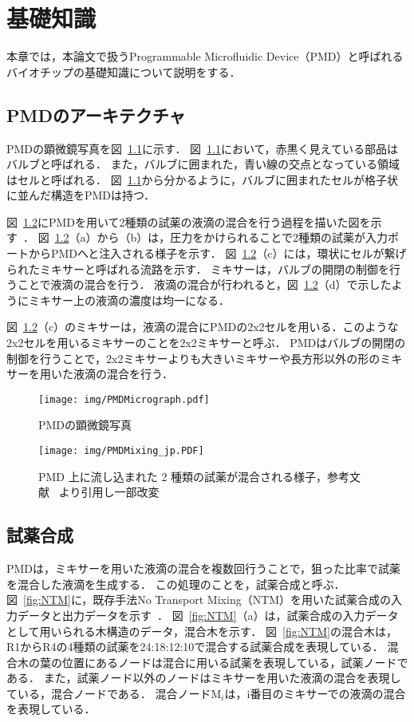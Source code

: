 \chapter{基礎知識}
本章では，本論文で扱うProgrammable Microfluidic Device（PMD）と呼ばれるバイオチップの基礎知識について説明をする．

\section{PMDのアーキテクチャ}
PMDの顕微鏡写真を図~\ref{fig:PMDMicrograph}に示す．
図~\ref{fig:PMDMicrograph}において，赤黒く見えている部品はバルブと呼ばれる．
また，バルブに囲まれた，青い線の交点となっている領域はセルと呼ばれる．
図~\ref{fig:PMDMicrograph}から分かるように，バルブに囲まれたセルが格子状に並んだ構造をPMDは持つ．

図~\ref{fig:MixingOnPMD}にPMDを用いて2種類の試薬の液滴の混合を行う過程を描いた図を示す~\cite{4}．
図~\ref{fig:MixingOnPMD}（a）から（b）は，圧力をかけられることで2種類の試薬が入力ポートからPMDへと注入される様子を示す．
図~\ref{fig:MixingOnPMD}（c）には，環状にセルが繋げられたミキサーと呼ばれる流路を示す．
ミキサーは，バルブの開閉の制御を行うことで液滴の混合を行う．
液滴の混合が行われると，図~\ref{fig:MixingOnPMD}（d）で示したようにミキサー上の液滴の濃度は均一になる．

図~\ref{fig:MixingOnPMD}（c）のミキサーは，液滴の混合にPMDの2x2セルを用いる．このような2x2セルを用いるミキサーのことを2x2ミキサーと呼ぶ．
PMDはバルブの開閉の制御を行うことで，2x2ミキサーよりも大きいミキサーや長方形以外の形のミキサーを用いた液滴の混合を行う．

\begin{figure}[tbp]
 \centering\texttt{[image: img/PMDMicrograph.pdf]}
 \caption{PMDの顕微鏡写真}\label{fig:PMDMicrograph}
\end{figure}

\begin{figure}[tbp]
    \centering\texttt{[image: img/PMDMixing\_jp.PDF]}
    \caption{PMD 上に流し込まれた 2 種類の試薬が混合される様子，参考文献~\cite{4} より引用し一部改変}\label{fig:MixingOnPMD}
\end{figure}

\section{試薬合成}
PMDは，ミキサーを用いた液滴の混合を複数回行うことで，狙った比率で試薬を混合した液滴を生成する．
この処理のことを，試薬合成と呼ぶ．図~\ref{fig:NTM}に，既存手法No Transport Mixing（NTM）を用いた試薬合成の入力データと出力データを示す~\cite{4}．
図~\ref{fig:NTM}（a）は，試薬合成の入力データとして用いられる木構造のデータ，混合木を示す．
図~\ref{fig:NTM}の混合木は，R1からR4の4種類の試薬を24:18:12:10で混合する試薬合成を表現している．
混合木の葉の位置にあるノードは混合に用いる試薬を表現している，試薬ノードである．
また，試薬ノード以外のノードはミキサーを用いた液滴の混合を表現している，混合ノードである．
混合ノードM$_i$は，i番目のミキサーでの液滴の混合を表現している．

